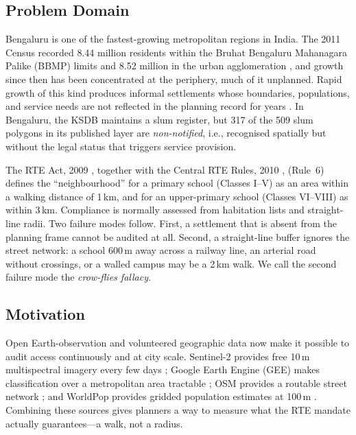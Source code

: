 \documentclass[conference]{IEEEtran}
\newcommand{\km}{\,km}
\newcommand{\m}{\,m}
\begin{document}
\subsection{Problem Domain}
Bengaluru is one of the fastest-growing metropolitan regions in India. The 2011 Census recorded 8.44 million residents within the Bruhat Bengaluru Mahanagara Palike (BBMP) limits and 8.52 million in the urban agglomeration \cite{census2011}, and growth since then has been concentrated at the periphery, much of it unplanned. Rapid growth of this kind produces informal settlements whose boundaries, populations, and service needs are not reflected in the planning record for years \cite{unhabitat2003}. In Bengaluru, the KSDB maintains a slum register, but 317 of the 509 slum polygons in its published layer are \emph{non-notified}, i.e., recognised spatially but without the legal status that triggers service provision.

The RTE Act, 2009 \cite{rte2009}, together with the Central RTE Rules, 2010 \cite{rterules2010}, (Rule~6) defines the ``neighbourhood'' for a primary school (Classes I--V) as an area within a walking distance of 1\km{}, and for an upper-primary school (Classes VI--VIII) as within 3\km{}. Compliance is normally assessed from habitation lists and straight-line radii. Two failure modes follow. First, a settlement that is absent from the planning frame cannot be audited at all. Second, a straight-line buffer ignores the street network: a school 600\m{} away across a railway line, an arterial road without crossings, or a walled campus may be a 2\km{} walk. We call the second failure mode the \emph{crow-flies fallacy}.

\subsection{Motivation}
Open Earth-observation and volunteered geographic data now make it possible to audit access continuously and at city scale. Sentinel-2 provides free 10\m{} multispectral imagery every few days \cite{drusch2012}; Google Earth Engine (GEE) makes classification over a metropolitan area tractable \cite{gorelick2017}; OSM provides a routable street network \cite{boeing2017}; and WorldPop provides gridded population estimates at 100\m{} \cite{tatem2017}. Combining these sources gives planners a way to measure what the RTE mandate actually guarantees---a walk, not a radius.
\end{document}
